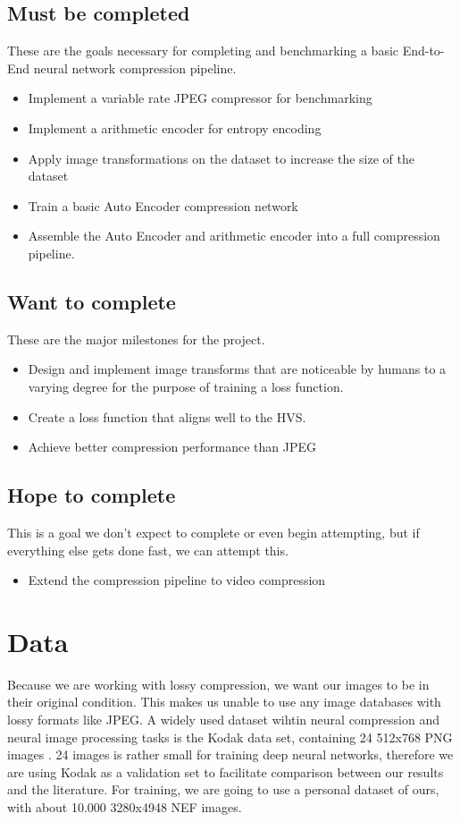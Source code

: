 \documentclass[]{article}
\begin{document}
\subsection*{Must be completed}
These are the goals necessary for completing and benchmarking a basic End-to-End neural network compression pipeline. 

\begin{itemize}
    \item Implement a variable rate JPEG compressor for benchmarking
    \item Implement a arithmetic encoder for entropy encoding
    \item Apply image transformations on the dataset to increase the size of the dataset
    \item Train a basic Auto Encoder compression network
    \item Assemble the Auto Encoder and arithmetic encoder into a full compression pipeline.
\end{itemize}

\subsection*{Want to complete}
These are the major milestones for the project. 

\begin{itemize}
    \item Design and implement image transforms that are noticeable by humans to a varying degree for the purpose of training a loss function.
    \item Create a loss function that aligns well to the HVS.
    \item Achieve better compression performance than JPEG
\end{itemize}

\subsection*{Hope to complete}
This is a goal we don't expect to complete or even begin attempting, but if everything else gets done fast, we can attempt this.
\begin{itemize}
    \item Extend the compression pipeline to video compression
\end{itemize}

\section*{Data}
Because we are working with lossy compression, we want our images to be in their original condition. This makes us unable to use any image databases with lossy formats like JPEG. A widely used dataset wihtin neural compression and neural image processing tasks is the Kodak data set, containing 24 512x768 PNG images \cite{Kodak}\cite{benchmark}. 24 images is rather small for training deep neural networks, therefore we are using  Kodak as a validation set to facilitate comparison between our results and the literature. For training, we are going to use a personal dataset of ours, with about 10.000 3280x4948 NEF images.
\end{document}

